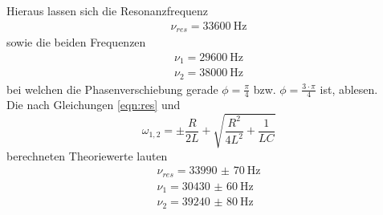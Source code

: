 \noindent Hieraus lassen sich die Resonanzfrequenz
\begin{align*}
  \nu_{res}= \SI{33600}{\hertz}
\end{align*}
sowie die beiden Frequenzen
\begin{align*}
  \nu_1 = \SI{29600}{\hertz} \\
  \nu_2 = \SI{38000}{\hertz}
\end{align*}
bei welchen die Phasenverschiebung gerade $\phi = \frac{\pi}{4}$ bzw. $\phi= \frac{3 \cdot \pi}{4}$
ist, ablesen. \\
\noindent Die nach Gleichungen \ref{eqn:res} und
\begin{equation}
  \omega_{1,2} = \pm \frac{R}{2L} + \sqrt{\frac{R^2}{4L^2} + \frac{1}{LC}}
\end{equation}
berechneten Theoriewerte lauten
\begin{align*}
  \nu_{res}= \SI{33990(70)}{\hertz} \\
  \nu_1 = \SI{30430(60)}{\hertz} \\
  \nu_2 = \SI{39240(80)}{\hertz}
\end{align*}
